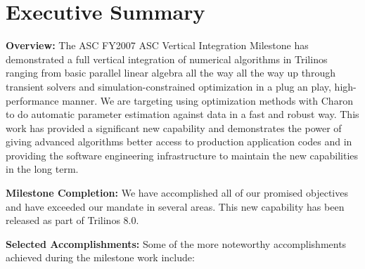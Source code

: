\documentclass[pdf,ps2pdf,11pt]{SANDreport}
\begin{document}
%
\clearpage
\tableofcontents
\listoffigures



\clearpage

\section{Executive Summary}

%
%

{}\noindent\textbf{Overview:} The ASC FY2007 ASC Vertical Integration
Milestone has demonstrated a full vertical integration of numerical algorithms
in Trilinos ranging from basic parallel linear algebra all the way all the way
up through transient solvers and simulation-constrained optimization in a plug
an play, high-performance manner.  We are targeting using optimization methods
with Charon to do automatic parameter estimation against data in a fast and
robust way.  This work has provided a significant new capability and
demonstrates the power of giving advanced algorithms better access to
production application codes and in providing the software engineering
infrastructure to maintain the new capabilities in the long term.

{}\noindent\textbf{Milestone Completion:} We have accomplished all of our
promised objectives and have exceeded our mandate in several areas.  This new
capability has been released as part of Trilinos 8.0.

{}\noindent\textbf{Selected Accomplishments:} Some of the more noteworthy
accomplishments achieved during the milestone work include:\\[0.5ex]
\end{document}
